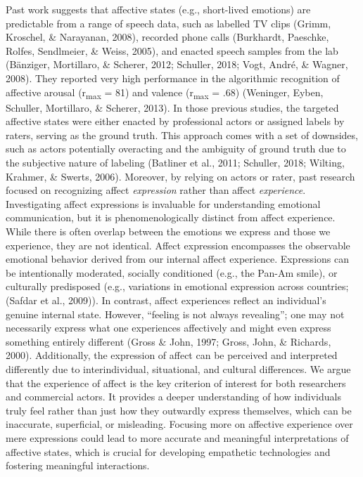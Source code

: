 \documentclass[
  english,
  man,floatsintext]{apa6}
\begin{document}
Past work suggests that affective states (e.g., short-lived emotions) are predictable from a range of speech data, such as labelled TV clips (Grimm, Kroschel, \& Narayanan, 2008), recorded phone calls (Burkhardt, Paeschke, Rolfes, Sendlmeier, \& Weiss, 2005), and enacted speech samples from the lab (Bänziger, Mortillaro, \& Scherer, 2012; Schuller, 2018; Vogt, André, \& Wagner, 2008). They reported very high performance in the algorithmic recognition of affective arousal (r\textsubscript{max} = 81) and valence (r\textsubscript{max} = .68) (Weninger, Eyben, Schuller, Mortillaro, \& Scherer, 2013). In those previous studies, the targeted affective states were either enacted by professional actors or assigned labels by raters, serving as the ground truth. This approach comes with a set of downsides, such as actors potentially overacting and the ambiguity of ground truth due to the subjective nature of labeling (Batliner et al., 2011; Schuller, 2018; Wilting, Krahmer, \& Swerts, 2006). Moreover, by relying on actors or rater, past research focused on recognizing affect \emph{expression} rather than affect \emph{experience}. Investigating affect expressions is invaluable for understanding emotional communication, but it is phenomenologically distinct from affect experience. While there is often overlap between the emotions we express and those we experience, they are not identical. Affect expression encompasses the observable emotional behavior derived from our internal affect experience. Expressions can be intentionally moderated, socially conditioned (e.g., the Pan-Am smile), or culturally predisposed (e.g., variations in emotional expression across countries; (Safdar et al., 2009)). In contrast, affect experiences reflect an individual's genuine internal state. However, ``feeling is not always revealing''; one may not necessarily express what one experiences affectively and might even express something entirely different (Gross \& John, 1997; Gross, John, \& Richards, 2000). Additionally, the expression of affect can be perceived and interpreted differently due to interindividual, situational, and cultural differences. We argue that the experience of affect is the key criterion of interest for both researchers and commercial actors. It provides a deeper understanding of how individuals truly feel rather than just how they outwardly express themselves, which can be inaccurate, superficial, or misleading. Focusing more on affective experience over mere expressions could lead to more accurate and meaningful interpretations of affective states, which is crucial for developing empathetic technologies and fostering meaningful interactions.
\end{document}
